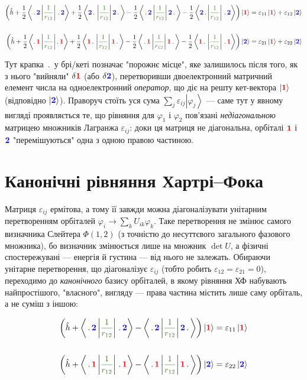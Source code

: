 \documentclass[]{article}
\def\ket#1{\left| #1 \right\rangle }
\def\opbracket#1#2#3{\left\langle #1\left| \textcolor{OliveGreen}{#2}\right|  #3 \right\rangle}
\let\vphi\varphi
\let\ve\varepsilon
\def\F{\textcolor{red}{\mathbf{1}}}
\def\S{\textcolor{blue}{\mathbf{2}}}
\def\h{\hat{h}}
\def\V{\frac{1}{r_{12}}}
\def\dt{\,.\,}
\begin{document}
\begin{align*}
    \left( \h + \frac12\opbracket{\dt\S}{\V}{\dt\S} + \frac12\opbracket{\S\dt}{\V}{\S\dt}
    - \frac12 \opbracket{\dt\S}{\V}{\S\dt} - \frac12\opbracket{\S\,.}{\V}{\dt\S}
    \right) \ket{\F} &= \ve_{11} \ket{\F} + \ve_{12}\ket{\S}
    \\[1.1\baselineskip]%
    \left( \h + \frac12\opbracket{.\,\F}{\V}{.\,\F} + \frac12\opbracket{\F\dt}{\V}{\F\dt}
    - \frac12 \opbracket{\dt\F}{\V}{\F\dt} - \frac12\opbracket{\F\dt}{\V}{\dt\F}
    \right) \ket{\S} &= \ve_{21} \ket{\F} + \ve_{22}\ket{\S}
\end{align*}

Тут крапка $\dt$ у брі/кеті позначає "порожнє місце", яке залишилось після того, як з нього "вийняли" $\delta\F$ (або $\delta\S$), перетворивши двоелектронний матричний елемент числа на одноелектронний \emph{оператор}, що діє на решту кет-вектора $\ket{\F}$ (відповідно $\ket{\S}$). Праворуч стоїть уся сума $\sum_j\ve_{ij}\ket{\vphi_j}$ --- саме тут у явному вигляді проявляється те, що рівняння для $\vphi_1$ і $\vphi_2$ пов'язані \emph{недіагональною} матрицею множників Лагранжа $\ve_{ij}$: доки ця матриця не діагональна, орбіталі $\F$ і $\S$ "перемішуються" одна з одною правою частиною.

\section{Канонічні рівняння Хартрі--Фока}

Матриця $\ve_{ij}$ ермітова, а тому її завжди можна діагоналізувати унітарним перетворенням орбіталей $\vphi_i\to\sum_k U_{ik}\vphi_k$. Таке перетворення не змінює самого визначника Слейтера $\Phi(1,2)$ (з точністю до несуттєвого загального фазового множника), бо визначник змінюється лише на множник $\det U$, а фізичні спостережувані --- енергія й густина --- від нього не залежать. Обираючи унітарне перетворення, що діагоналізує $\ve_{ij}$ (тобто робить $\ve_{12}=\ve_{21}=0$), переходимо до \emph{канонічного} базису орбіталей, в якому рівняння ХФ набувають найпростішого, "власного", вигляду --- права частина містить лише саму орбіталь, а не суміш з іншою:

\begin{align*}
    \left( \h + \opbracket{\dt\S}{\V}{\dt\S}
    - \opbracket{\dt\S}{\V}{\S\dt}
    \right) \ket{\F} &= \ve_{11} \ket{\F}
    \\[1.1\baselineskip]%
    \left( \h + \opbracket{\dt\F}{\V}{\dt\F}
    -  \opbracket{\dt\F}{\V}{\F\dt}
    \right) \ket{\S} &= \ve_{22} \ket{\S}
\end{align*}
\end{document}
